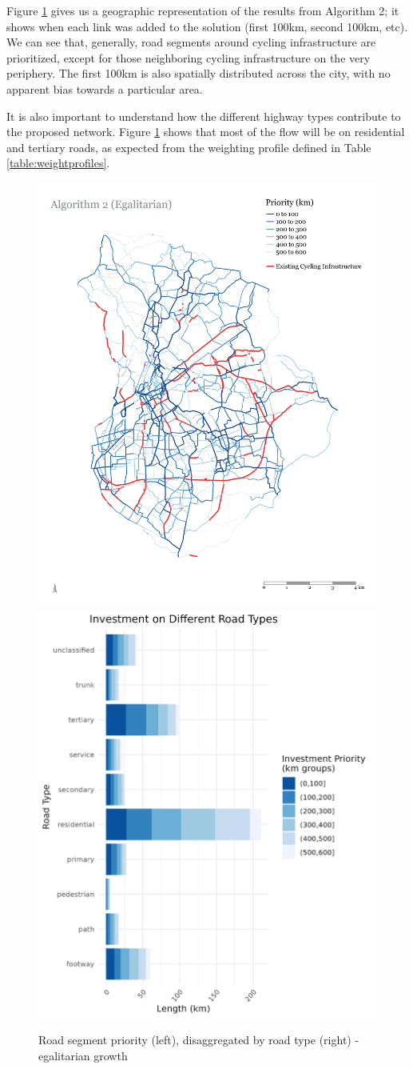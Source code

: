 \documentclass[
]{article}
\begin{document}
Figure \ref{fig:growth3MapandBar} gives us a geographic representation of the results from Algorithm 2; it shows when each link was added to the solution (first 100km, second 100km, etc).
We can see that, generally, road segments around cycling infrastructure are prioritized, except for those neighboring cycling infrastructure on the very periphery.
The first 100km is also spatially distributed across the city, with no apparent bias towards a particular area.

It is also important to understand how the different highway types contribute to the proposed network.
Figure \ref{fig:growth3MapandBar} shows that most of the flow will be on residential and tertiary roads, as expected from the weighting profile defined in Table \ref{table:weightprofiles}.

\begin{figure}

{\centering \includegraphics[width=0.45\linewidth]{data/Manchester/Plots/Growth_Results/growth_egalitarian_priority_all_FLOW} \includegraphics[width=0.45\linewidth]{data/Manchester/Plots/Growth_Results/growth_egalitarian_investment_highways_flow} 

}

\caption{Road segment priority (left), disaggregated by road type (right) - egalitarian growth}\label{fig:growth3MapandBar}
\end{figure}
\end{document}
